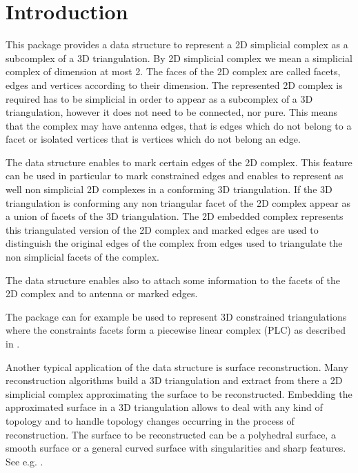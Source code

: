 	
\label{chapter_C2inT3}


\vspace*{-15mm}
\minitoc
\vspace*{30mm}

\section{Introduction\label{section_C2inT3_Intro}}
This package provides a data structure to  represent a
2D simplicial complex as a subcomplex of a 3D triangulation.
By 2D simplicial complex we mean a simplicial complex of dimension at
most 2. The faces of the 2D complex are called
facets, edges and vertices according to their dimension.
The represented 2D complex is required has to be simplicial 
in order to appear 
as a subcomplex of a 3D triangulation, however 
it does not need to be connected, nor pure.
This   means that the complex may have antenna edges, that is 
edges which do not belong to a facet  or 
isolated vertices that is vertices which do not belong an edge.

The data structure enables to mark certain edges of the 2D complex.
This feature can be used in particular
to mark constrained edges and enables 
to represent as well non simplicial 2D complexes 
in a conforming 3D triangulation.
If the 3D triangulation is conforming any non triangular facet
of the 2D complex appear as a union of facets of the 3D triangulation.
The 2D embedded complex represents this triangulated version of the
2D complex and marked edges are used to distinguish  the original
edges  of the complex from edges used to triangulate
the non simplicial facets of the complex.

The data structure enables also to attach some information to the
facets of the 2D complex and to antenna or marked edges.

The package can for example be used to represent 3D constrained
triangulations where the constraints facets form a piecewise linear
complex (PLC) as described in \cite{s-cgehd-98}.

Another typical application of the data structure is surface
reconstruction. Many reconstruction algorithms
build a 3D triangulation and extract from there
a 2D simplicial complex approximating the surface to be reconstructed.
Embedding the approximated surface in a 3D
triangulation allows to deal with any kind of topology and to handle
topology changes occurring in the process of reconstruction.
The surface to be reconstructed can be 
a polyhedral surface, a smooth surface or a general curved surface
with singularities and sharp features. See e.g. \cite{prisme-bo-03}.

